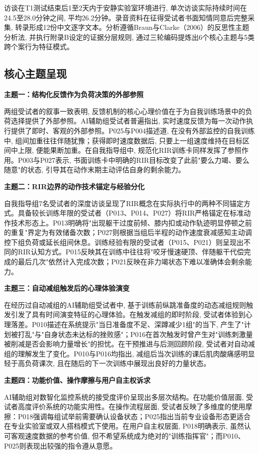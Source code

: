 访谈在T1测试结束后1至2天内于安静实验室环境进行, 单次访谈实际持续时间在24.5至28.0分钟之间, 平均26.2分钟。录音资料在征得受试者书面知情同意后完整采集, 转录形成12份中文逐字文本。分析遵循Braun与Clarke（2006）的反思性主题分析法, 并执行附录B设定的证据分层规则, 通过三轮编码提炼出6个核心主题与5类跨个案行为特征模式。

\subsection{核心主题呈现}
\label{sec:themes}

\textbf{主题一：结构化反馈作为负荷决策的外部参照}

两组受试者的叙事一致表明, 反馈机制的核心心理价值在于为自我训练场景中的负荷选择提供了外部参照。AI辅助组受试者普遍指出, 实时速度反馈为每一次动作执行提供了即时、客观的外部参照。P025与P004描述道, 在没有外部监控的自我训练中, 组间加重往往伴随犹豫；获得即时速度数据后, 只要上一组速度维持在目标区间中上限, 便能果断加重。在自我指导组中, 规范化RIR训练卡同样发挥了参照作用。P003与P027表示, 书面训练卡中明确的RIR目标改变了此前"要么力竭、要么随意"的状态, 引导其在动作末期主动评估自身的剩余能力。

\textbf{主题二：RIR边界的动作技术锚定与经验分化}

自我指导组7名受试者的深度访谈呈现了RIR概念在实际执行中的两种不同锚定方式。具备较长训练年限的受试者（P013、P014、P027）将RIR严格锚定在标准动作技术形态上。P013明确将"出现躯干过度前倾、膝内扣或动作轨迹明显停顿之前的重复"界定为有效储备次数；P027则根据当组后半程的动作速度衰减感知主动调控下组负荷或延长组间休息。训练经验有限的受试者（P015、P021）则呈现出不同的RIR认知方式。P015反映其在训练中往往将"咬牙慢速硬顶、伴随躯干代偿完成的最后几次"依然计入完成次数；P021反映在非力竭状态下难以准确体会剩余能力。

\textbf{主题三：自动减组触发后的心理体验演变}

在经历过自动减组的AI辅助组受试者中, 基于训练前纵跳准备度的动态减组规则触发引发了具有时间演变特征的心理体验。在触发减组的即时阶段, 受试者体验到心理落差。P010描述在系统提示"当日准备度不足、深蹲减少1组"的当下, 产生了"计划被打乱"与"自身状态未达标的挫败感"；P016在首次触发时曾产生对"训练刺激量被削减是否会影响力量增长"的担忧。在干预推进与后测回顾阶段, 受试者对自动减组的理解发生了变化。P010与P016均指出, 减组后当次训练的课后肌肉酸痛感明显轻于高负荷课次, 且在随后的下一次训练中展现出良好的力量状态。

\textbf{主题四：功能价值、操作摩擦与用户自主权诉求}

AI辅助组对数智化监控系统的接受度评价呈现出多层次结构。在功能价值层面, 受试者高度评价系统的功能实用性。在操作流程层面, 受试者反映了多维度的使用摩擦：P018强调每组试举前需要确认设备状态；P025指出当前专业设备形态更适合在专业实验室或双人搭档模式下使用。在用户自主权层面, P018明确表示, 虽然认可客观速度数据的参考价值, 但不希望系统成为绝对的"训练指挥官"；而P010、P025则表现出较强的指令遵从意愿。

